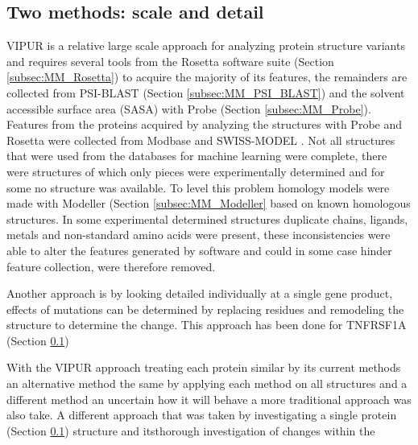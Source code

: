 
\subsection{Two methods: scale and detail}
VIPUR is a relative large scale approach for analyzing protein structure variants and requires several tools from the Rosetta software suite (Section \ref{subsec:MM_Rosetta}) to acquire the majority of its features, the remainders are collected from PSI-BLAST (Section \ref{subsec:MM_PSI_BLAST}) and the solvent accessible surface area (SASA) with Probe (Section \ref{subsec:MM_Probe}). Features from the proteins acquired by analyzing the structures with Probe and Rosetta were collected from Modbase \cite{} and
SWISS-MODEL \cite{}.
Not all structures that were used from the databases for machine learning were complete, there were structures of which only pieces were experimentally determined and for some no structure was available. To level this problem homology models were made with Modeller (Section \ref{subsec:MM_Modeller} based on known homologous structures. In some experimental determined structures duplicate chains, ligands, metals and non-standard amino acids were present, these inconsistencies were able to alter the features generated by software and could in some case hinder feature collection, were therefore removed.

Another approach is by looking detailed individually at a single gene product, effects of mutations can be determined by replacing residues and remodeling the structure to determine the change. This approach has been done for TNFRSF1A (Section \ref{})


With the VIPUR approach treating each protein similar by its current methods an alternative method  the same by applying each method on all structures and   a different method an uncertain how it will behave a more traditional approach was also take.
A different approach that was taken by investigating a single protein (Section \ref{}) structure and itsthorough investigation of changes within the

